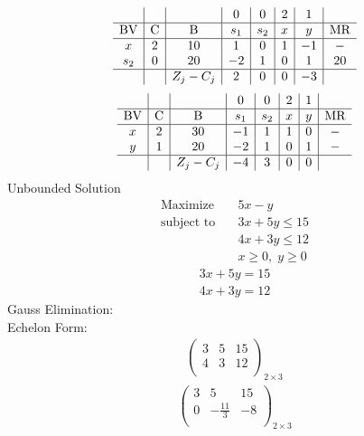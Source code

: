 \documentclass{article}
\begin{document}
\begin{align*}
\begin{array}{c|c|c|c|c|c|c|c}
 &  &  & 0 & 0 & 2 & 1 & \\
\hline
\text{BV} & \text{C} & \text{B} & s_{1} & s_{2} & x & y & \text{MR} \\
\hline
x & 2 & 10 & 1 & 0 & 1 & -1 & - \\
s_{2} & 0 & 20 & -2 & 1 & 0 & 1 & 20 \\
\hline
 &  & Z_j-C_j & 2 & 0 & 0 & -3 & \\
\end{array}
\end{align*}
\begin{align*}
\begin{array}{c|c|c|c|c|c|c|c}
 &  &  & 0 & 0 & 2 & 1 & \\
\hline
\text{BV} & \text{C} & \text{B} & s_{1} & s_{2} & x & y & \text{MR} \\
\hline
x & 2 & 30 & -1 & 1 & 1 & 0 & - \\
y & 1 & 20 & -2 & 1 & 0 & 1 & - \\
\hline
 &  & Z_j-C_j & -4 & 3 & 0 & 0 & \\
\end{array}
\end{align*}
Unbounded Solution\\
\begin{align*}
\text{Maximize} \quad & 5x - y\\
\text{subject to} \quad
& 3x + 5y\le15\\
& 4x + 3y\le12\\
& x\ge0,\; y\ge0\end{align*}
\begin{align*}
3x + 5y=15\end{align*}
\begin{align*}
4x + 3y=12\end{align*}
Gauss Elimination:\\
Echelon Form:\\
\begin{align*}
\left(
\begin{array}{cc|c}
3 & 5 & 15\\
4 & 3 & 12\\
\end{array}
\right)_{2\times 3}
\end{align*}
\begin{align*}
\left(
\begin{array}{cc|c}
3 & 5 & 15\\
0 & -\frac{11}{3} & -8\\
\end{array}
\right)_{2\times 3}
\end{align*}
\end{document}
